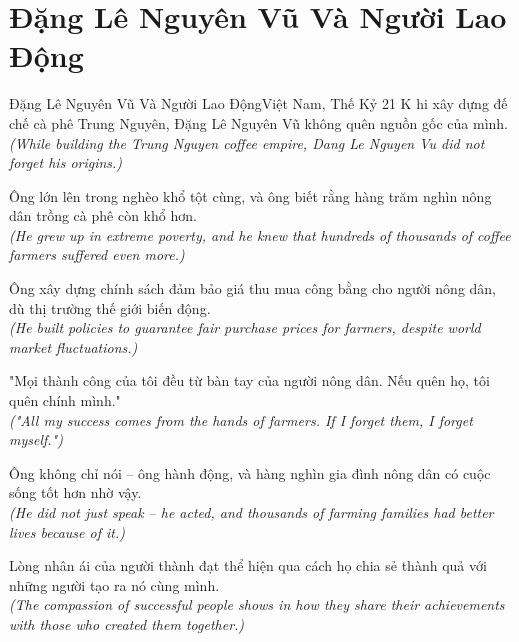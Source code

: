 \section{Đặng Lê Nguyên Vũ Và Người Lao Động}
\begin{truyen}{Đặng Lê Nguyên Vũ Và Người Lao Động}{Việt Nam, Thế Kỷ 21}
K hi xây dựng đế chế cà phê Trung Nguyên, Đặng Lê Nguyên Vũ không quên nguồn gốc của mình.\\
\textit{(While building the Trung Nguyen coffee empire, Dang Le Nguyen Vu did not forget his origins.)}

Ông lớn lên trong nghèo khổ tột cùng, và ông biết rằng hàng trăm nghìn nông dân trồng cà phê còn khổ hơn.\\
\textit{(He grew up in extreme poverty, and he knew that hundreds of thousands of coffee farmers suffered even more.)}

Ông xây dựng chính sách đảm bảo giá thu mua công bằng cho người nông dân, dù thị trường thế giới biến động.\\
\textit{(He built policies to guarantee fair purchase prices for farmers, despite world market fluctuations.)}

"Mọi thành công của tôi đều từ bàn tay của người nông dân. Nếu quên họ, tôi quên chính mình."\\
\textit{("All my success comes from the hands of farmers. If I forget them, I forget myself.")}

Ông không chỉ nói -- ông hành động, và hàng nghìn gia đình nông dân có cuộc sống tốt hơn nhờ vậy.\\
\textit{(He did not just speak -- he acted, and thousands of farming families had better lives because of it.)}

\end{truyen}
\begin{baihoc}
  Lòng nhân ái của người thành đạt thể hiện qua cách họ chia sẻ thành quả với những người tạo ra nó cùng mình.\\
  \textit{(The compassion of successful people shows in how they share their achievements with those who created them together.)}
\end{baihoc}
